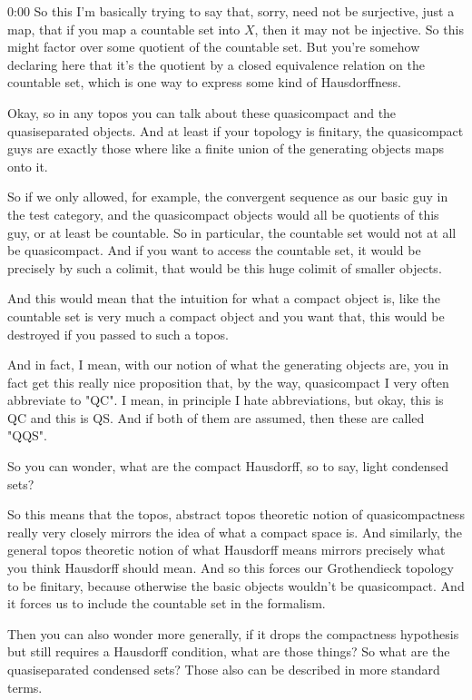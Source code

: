 \begin{unfinished}{0:00}
So this I'm basically trying to say that, sorry, need not be surjective, just a map, that if you map a countable set into $X$, then it may not be injective. So this might factor over some quotient of the countable set. But you're somehow declaring here that it's the quotient by a closed equivalence relation on the countable set, which is one way to express some kind of Hausdorffness.

Okay, so in any topos you can talk about these quasicompact and the quasiseparated objects. And at least if your topology is finitary, the quasicompact guys are exactly those where like a finite union of the generating objects maps onto it.

So if we only allowed, for example, the convergent sequence as our basic guy in the test category, and the quasicompact objects would all be quotients of this guy, or at least be countable. So in particular, the countable set would not at all be quasicompact. And if you want to access the countable set, it would be precisely by such a colimit, that would be this huge colimit of smaller objects.

And this would mean that the intuition for what a compact object is, like the countable set is very much a compact object and you want that, this would be destroyed if you passed to such a topos.

And in fact, I mean, with our notion of what the generating objects are, you in fact get this really nice proposition that, by the way, quasicompact I very often abbreviate to "QC". I mean, in principle I hate abbreviations, but okay, this is QC and this is QS. And if both of them are assumed, then these are called "QQS".

So you can wonder, what are the compact Hausdorff, so to say, light condensed sets?

So this means that the topos, abstract topos theoretic notion of quasicompactness really very closely mirrors the idea of what a compact space is. And similarly, the general topos theoretic notion of what Hausdorff means mirrors precisely what you think Hausdorff should mean. And so this forces our Grothendieck topology to be finitary, because otherwise the basic objects wouldn't be quasicompact. And it forces us to include the countable set in the formalism.

Then you can also wonder more generally, if it drops the compactness hypothesis but still requires a Hausdorff condition, what are those things? So what are the quasiseparated condensed sets? Those also can be described in more standard terms.


\end{unfinished}

